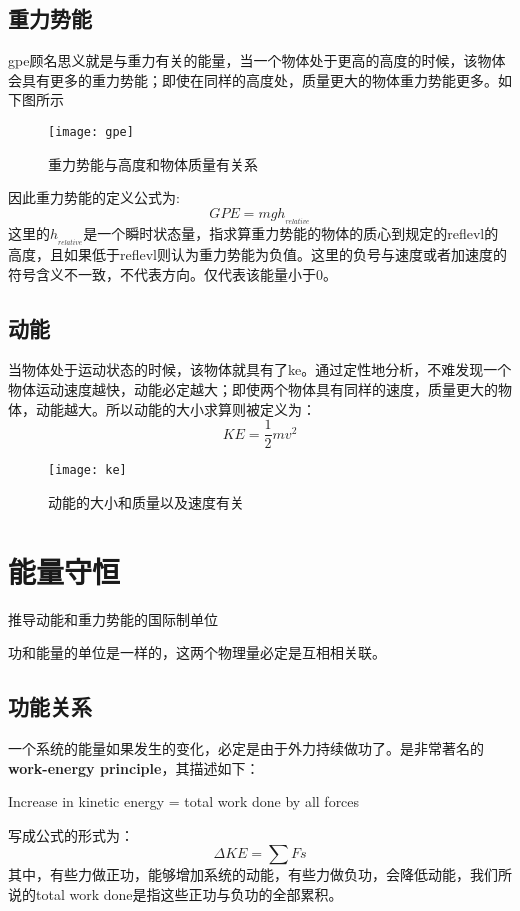 \subsection*{重力势能}
\label{subsec:Gravitational Potential Energy}
\gls{gpe}顾名思义就是与重力有关的能量，当一个物体处于更高的高度的时候，该物体会具有更多的重力势能；即使在同样的高度处，质量更大的物体重力势能更多。如下图所示
\begin{figure}[H]
\centering
\texttt{[image: gpe]} 
\caption{重力势能与高度和物体质量有关系}
\end{figure}

因此重力势能的定义公式为:
\[
	GPE=mgh_{_{relative}}
\]
这里的$h_{_{relative}}$是一个瞬时状态量，指求算重力势能的物体的质心到规定的\gls{reflevl}的高度，且如果低于\gls{reflevl}则认为重力势能为负值。这里的负号与速度或者加速度的符号含义不一致，不代表方向。仅代表该能量小于0。

\subsection*{动能}
\label{subsec:Kinetic Energy}
当物体处于运动状态的时候，该物体就具有了\gls{ke}。通过定性地分析，不难发现一个物体运动速度越快，动能必定越大；即使两个物体具有同样的速度，质量更大的物体，动能越大。所以动能的大小求算则被定义为：
\[
	KE=\frac{1}{2}mv^2
\]
\begin{figure}[H]
\centering
\texttt{[image: ke]}  %
\caption{动能的大小和质量以及速度有关}
\end{figure}
\clearpage

\section{能量守恒}
\begin{TaskBox}
 推导动能和重力势能的国际制单位
\end{TaskBox}
功和能量的单位是一样的，这两个物理量必定是互相相关联。

\subsection*{功能关系}
一个系统的能量如果发生的变化，必定是由于外力持续做功了。是非常著名的\textbf{work-energy principle}，其描述如下：
\begin{theorem}
Increase in kinetic energy = total work done by all forces
\end{theorem}
写成公式的形式为：
\[
	\Delta KE = \sum Fs
\]
其中，有些力做正功，能够增加系统的动能，有些力做负功，会降低动能，我们所说的total work done是指这些正功与负功的全部累积。

